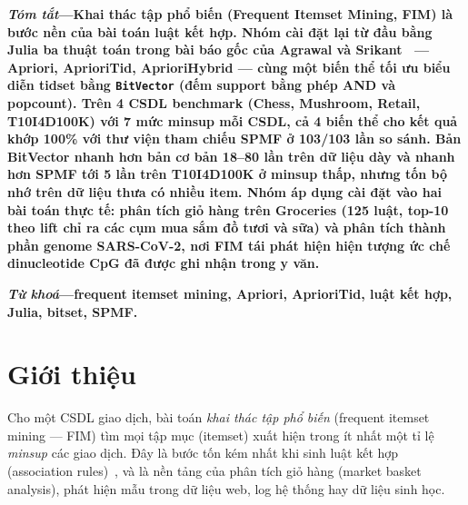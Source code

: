 \documentclass[10pt,twocolumn,letterpaper]{article}
\begin{document}

\noindent\textbf{\textit{Tóm tắt}—Khai thác tập phổ biến (Frequent Itemset Mining, FIM) là bước nền của bài toán luật kết hợp. Nhóm cài đặt lại từ đầu bằng Julia ba thuật toán trong bài báo gốc của Agrawal và Srikant~\cite{agrawal1994} — Apriori, AprioriTid, AprioriHybrid — cùng một biến thể tối ưu biểu diễn tidset bằng \texttt{BitVector} (đếm support bằng phép AND và popcount). Trên 4 CSDL benchmark (Chess, Mushroom, Retail, T10I4D100K) với 7 mức minsup mỗi CSDL, cả 4 biến thể cho kết quả khớp 100\% với thư viện tham chiếu SPMF ở 103/103 lần so sánh. Bản BitVector nhanh hơn bản cơ bản 18–80 lần trên dữ liệu dày và nhanh hơn SPMF tới 5 lần trên T10I4D100K ở minsup thấp, nhưng tốn bộ nhớ trên dữ liệu thưa có nhiều item. Nhóm áp dụng cài đặt vào hai bài toán thực tế: phân tích giỏ hàng trên Groceries (125 luật, top-10 theo lift chỉ ra các cụm mua sắm đồ tươi và sữa) và phân tích thành phần genome SARS-CoV-2, nơi FIM tái phát hiện hiện tượng ức chế dinucleotide CpG đã được ghi nhận trong y văn.}

\vspace{4pt}
\noindent\textbf{\textit{Từ khoá}—frequent itemset mining, Apriori, AprioriTid, luật kết hợp, Julia, bitset, SPMF.}

\section{Giới thiệu}
Cho một CSDL giao dịch, bài toán \emph{khai thác tập phổ biến} (frequent itemset mining — FIM) tìm mọi tập mục (itemset) xuất hiện trong ít nhất một tỉ lệ \emph{minsup} các giao dịch. Đây là bước tốn kém nhất khi sinh luật kết hợp (association rules)~\cite{agrawal1993}, và là nền tảng của phân tích giỏ hàng (market basket analysis), phát hiện mẫu trong dữ liệu web, log hệ thống hay dữ liệu sinh học.
\end{document}
